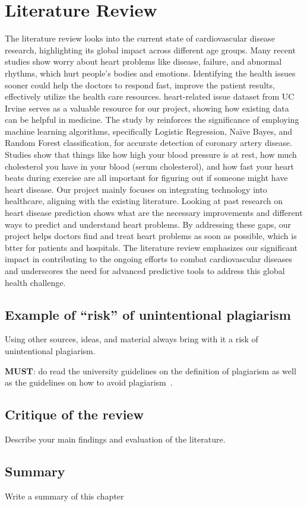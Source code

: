 \chapter{Literature Review}
\label{ch:lit_rev} %
The literature review looks into the current state of cardiovascular disease research, highlighting its global impact across different age groups. Many recent studies show worry about heart problems like disease, failure, and abnormal rhythms, which hurt people's bodies and emotions. Identifying the health issues sooner could help the doctors to respond fast, improve the patient results, effectively utilize the health care resources. \citep{janosi-1988} heart-related issue dataset from UC Irvine serves as a valuable resource for our project, showing how existing data can be helpful in medicine. The study by \citep{Sharma-2020} reinforces the significance of employing machine learning algorithms, specifically Logistic Regression, Naïve Bayes, and Random Forest classification, for accurate detection of coronary artery disease. Studies show that things like how high your blood pressure is at rest, how much cholesterol you have in your blood (serum cholesterol), and how fast your heart beats during exercise are all important for figuring out if someone might have heart disease. Our project mainly focuses on integrating technology into healthcare, aligning with the existing literature. Looking at past research on heart disease prediction shows what are the necessary improvements and different ways to predict and understand heart problems. By addressing these gaps, our project helps doctors find and treat heart problems as soon as possible, which is btter for patients and hospitals. The literature review emphasizes our significant impact in contributing to the ongoing efforts to combat cardiovascular diseases and underscores the need for advanced predictive tools to address this global health challenge.

\section{Example of ``risk'' of unintentional plagiarism}
Using other sources, ideas, and material always bring with it a risk of unintentional plagiarism. 

\noindent
\textbf{\color{red}MUST}: do read the university guidelines on the definition of plagiarism as well as the guidelines on how to avoid plagiarism~\citep{uor_plagiarism}.




\section{Critique of the review} %
Describe your main findings and evaluation of the literature. ~\\

\section{Summary} 
Write a summary of this chapter~\\
